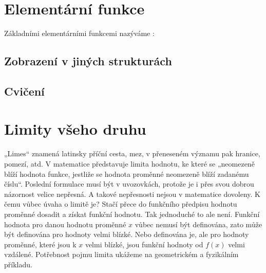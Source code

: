   \section{Elementární funkce}
      Základními elementárními funkcemi nazýváme \cite[s.~10]{PolakMA1}:
     
    \subsection{Zobrazení v jiných strukturách}
    \subsection{Cvičení}
  \section{Limity všeho druhu}  
    „Limes“ znamená latinsky příční cesta, mez, v přeneseném významu pak hranice, pomezí, atd. V 
    matematice představuje limita hodnotu, ke které se „neomezeně blíží hodnota funkce, jestliže se 
    hodnota proměnné neomezeně blíží zadanému číslu“. Poslední formulace musí být v uvozovkách, 
    protože je i přes svou dobrou názornost velice nepřesná. A takové nepřesnosti nejsou v 
    matematice dovoleny. K čemu vůbec úvaha o limitě je? Stačí přece do funkčního předpisu hodnotu 
    proměnné dosadit a získat funkční hodnotu. Tak jednoduché to ale není. Funkční hodnota pro 
    danou hodnotu proměnné \(x\) vůbec nemusí být definována, zato může být definována pro hodnoty 
    velmi blízké. Nebo definována je, ale pro hodnoty proměnné, které jsou k \(x\) velmi blízké, 
    jsou funkční hodnoty od \(f(x)\) velmi vzdálené. Potřebnost pojmu limita ukážeme na 
    geometrickém a fyzikálním příkladu.
    
